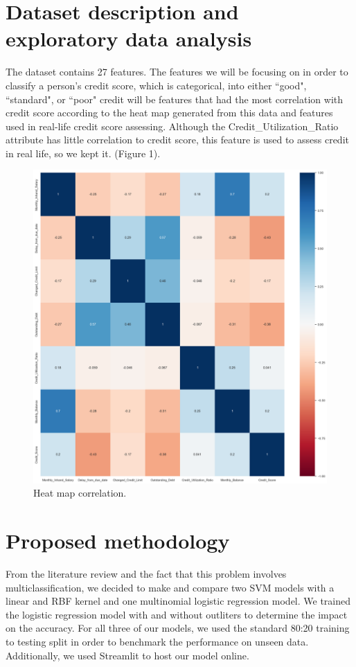 \documentclass[11pt, twocolumn]{article}
\begin{document}
\section*{Dataset description and exploratory data analysis}
The dataset contains 27 features. The features we will be focusing on in order
to classify a person's credit score, which is categorical, into either ``good", ``standard", or ``poor" credit
will be features that had the most correlation with credit score according to the heat map
generated from this data and features used in real-life credit score assessing. Although the Credit\_Utilization\_Ratio attribute has little 
correlation to credit score, this feature is used to assess credit in real life, so we kept it. (Figure 1).\\
\begin{figure}[h]
    \begin{center}
    \includegraphics[width=\columnwidth]{images/credscoreheatmap.png}
    \caption{Heat map correlation.}
    \label{fig:figure1}
    \end{center}
\end{figure}
\section*{Proposed methodology}
From the literature review and the fact that this problem involves multiclassification,
we decided to make and compare two SVM models with a linear and RBF kernel and one 
multinomial logistic regression model. We trained the logistic regression model with and without
outliters to determine the impact on the accuracy. For all three of our models, we used
the standard 80:20 training to testing split in order to benchmark the performance on unseen
data. Additionally, we used Streamlit to host our model online.
\end{document}
